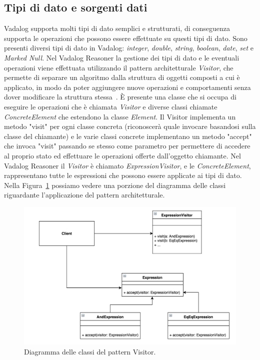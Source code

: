 \subsection{Tipi di dato e sorgenti dati}

Vadalog supporta molti tipi di dato semplici e strutturati, di conseguenza supporta le operazioni che possono essere effettuate su questi tipi di dato. Sono presenti diversi tipi di dato in Vadalog: \emph{integer}, \emph{double}, \emph{string}, \emph{boolean}, \emph{date}, \emph{set} e \emph{Marked Null}. \newline
Nel Vadalog Reasoner la gestione dei tipi di dato e le eventuali operazioni viene effettuata utilizzando il pattern architetturale \emph{Visitor}, che permette di separare un algoritmo dalla struttura di oggetti composti a cui è applicato, in modo da poter aggiungere nuove operazioni e comportamenti senza dover modificare la struttura stessa~\cite{vlissides1995design}. È presente una classe che si occupa di eseguire le operazioni che è chiamata \emph{Visitor} e diverse classi chiamate \emph{ConcreteElement} che estendono la classe \emph{Element}. Il Visitor implementa un metodo "visit" per ogni classe concreta (riconoscerà quale invocare basandosi sulla classe del chiamante) e le varie classi concrete implementano un metodo "accept" che invoca "visit" passando se stesso come parametro per permettere di accedere al proprio stato ed effettuare le operazioni offerte dall'oggetto chiamante. \newline
Nel Vadalog Reasoner il \emph{Visitor} è chiamato \emph{ExpressionVisitor}, e le \emph{ConcreteElement}, rappresentano tutte le espressioni che possono essere applicate ai tipi di dato. Nella Figura~\ref{fig:visitoruml} possiamo vedere una porzione del diagramma delle classi riguardante l'applicazione del pattern architetturale. 
\begin{figure}[h]
	\centering
	\includegraphics[width=0.8\linewidth]{figure/visitor_uml}
	\caption{Diagramma delle classi del pattern Visitor.}
	\label{fig:visitoruml}
\end{figure}

